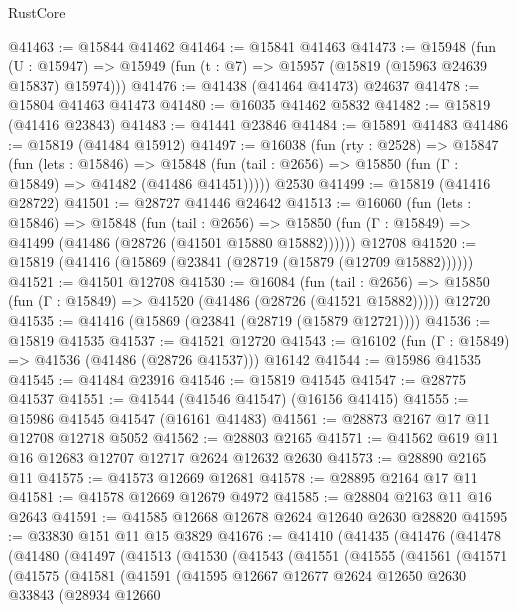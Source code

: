 \begin{lexlean}{RustCore}
\begin{coremodule}
@41463 := @15844 @41462
@41464 := @15841 @41463
@41473 := @15948
    (fun (U : @15947) => @15949 (fun (t : @7) => @15957 (@15819 (@15963 @24639 @15837) @15974)))
@41476 := @41438 (@41464 @41473) @24637
@41478 := @15804 @41463 @41473
@41480 := @16035 @41462 @5832
@41482 := @15819 (@41416 @23843)
@41483 := @41441 @23846
@41484 := @15891 @41483
@41486 := @15819 (@41484 @15912)
@41497 := @16038
    (fun (rty : @2528) =>
    @15847
      (fun (lets : @15846) =>
      @15848 (fun (tail : @2656) => @15850 (fun (Γ : @15849) => @41482 (@41486 @41451)))))
    @2530
@41499 := @15819 (@41416 @28722)
@41501 := @28727 @41446 @24642
@41513 := @16060
    (fun (lets : @15846) =>
    @15848
      (fun (tail : @2656) =>
      @15850 (fun (Γ : @15849) => @41499 (@41486 (@28726 (@41501 @15880 @15882))))))
    @12708
@41520 := @15819 (@41416 (@15869 (@23841 (@28719 (@15879 (@12709 @15882))))))
@41521 := @41501 @12708
@41530 := @16084
    (fun (tail : @2656) => @15850 (fun (Γ : @15849) => @41520 (@41486 (@28726 (@41521 @15882)))))
    @12720
@41535 := @41416 (@15869 (@23841 (@28719 (@15879 @12721))))
@41536 := @15819 @41535
@41537 := @41521 @12720
@41543 := @16102 (fun (Γ : @15849) => @41536 (@41486 (@28726 @41537))) @16142
@41544 := @15986 @41535
@41545 := @41484 @23916
@41546 := @15819 @41545
@41547 := @28775 @41537
@41551 := @41544 (@41546 @41547) (@16156 @41415)
@41555 := @15986 @41545 @41547 (@16161 @41483)
@41561 := @28873 @2167 @17 @11 @12708 @12718 @5052
@41562 := @28803 @2165
@41571 := @41562 @619 @11 @16 @12683 @12707 @12717 @2624 @12632 @2630
@41573 := @28890 @2165 @11
@41575 := @41573 @12669 @12681
@41578 := @28895 @2164 @17 @11
@41581 := @41578 @12669 @12679 @4972
@41585 := @28804 @2163 @11 @16 @2643
@41591 := @41585 @12668 @12678 @2624 @12640 @2630 @28820
@41595 := @33830 @151 @11 @15 @3829
@41676 := @41410
    (@41435
      (@41476
        (@41478
          (@41480
            (@41497
              (@41513
                (@41530
                  (@41543
                    (@41551
                      (@41555
                        (@41561
                          (@41571
                            (@41575
                              (@41581
                                (@41591
                                  (@41595
                                    @12667
                                    @12677
                                    @2624
                                    @12650
                                    @2630
                                    @33843
                                    (@28934
                                      @12660

\end{coremodule}
\end{lexlean}
